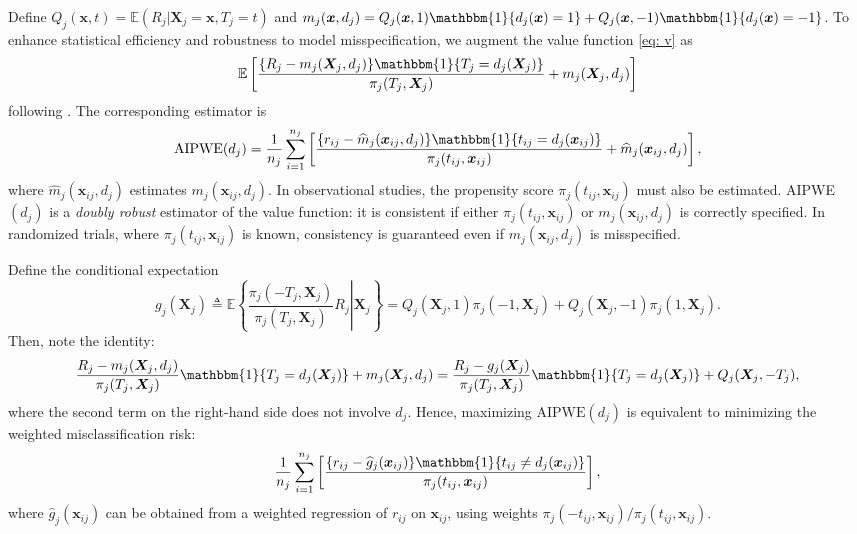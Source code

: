 \documentclass[12pt]{article}
\begin{document}
Define $Q_j(\boldsymbol x,t)=\mathbb{E}(R_j|\boldsymbol X_j=\boldsymbol x, T_{j}=t)$ and $m_j(\boldsymbol x,d_j)=Q_j(\boldsymbol x,1)\mathbbm{1}\{d_j(\boldsymbol x)=1\}+Q_j(\boldsymbol x,-1)\mathbbm{1}\{d_j(\boldsymbol x)=-1\}$. To enhance statistical efficiency and robustness to model misspecification, we augment the value function \eqref{eq: v} as 
\begin{equation*}
\mathbb{E}\left[\frac{\{R_j-m_j(\boldsymbol X_j, d_j)\}\mathbbm{1}\{T_j=d_j(\boldsymbol X_j)\}}{\pi_j(T_j,\boldsymbol X_j)}+m_j(\boldsymbol X_j, d_j)\right]
\end{equation*}
following \cite{zhang2012robust}. The corresponding estimator is
\begin{equation*}
\text{AIPWE}(d_j)=\frac{1}{n_j}\sum^{n_j}_{i=1}\left[\frac{\left\{r_{ij}-\widehat{m}_j(\boldsymbol x_{ij}, d_j)\}\mathbbm{1}\{t_{ij}=d_j(\boldsymbol x_{ij})\right\}}{\pi_j(t_{ij}, \boldsymbol x_{ij})}+\widehat{m}_j(\boldsymbol x_{ij}, d_j)\right],
\end{equation*}
where $\widehat{m}_j(\boldsymbol x_{ij}, d_j)$ estimates $m_j(\boldsymbol x_{ij}, d_j)$. In observational studies, the propensity score $\pi_j(t_{ij}, \boldsymbol x_{ij})$ must also be estimated. AIPWE$(d_j)$ is a {\it doubly robust} estimator of the value function: it is consistent if either $\pi_j(t_{ij}, \boldsymbol x_{ij})$ or $m_j(\boldsymbol x_{ij}, d_j)$ is correctly specified. In randomized trials, where $\pi_j(t_{ij}, \boldsymbol x_{ij})$ is known, consistency is guaranteed even if $m_j(\boldsymbol x_{ij}, d_j)$ is misspecified.

Define the conditional expectation
\begin{equation*}
g_j(\boldsymbol X_j)\triangleq\mathbb{E}\left\{\left.\frac{\pi_j(-T_j,\boldsymbol X_j)}{\pi_j(T_j,\boldsymbol X_j)}R_j\right|\boldsymbol X_j\right\}=Q_j(\boldsymbol X_j,1)\pi_j(-1,\boldsymbol X_j)+Q_j(\boldsymbol X_j,-1)\pi_j(1,\boldsymbol X_j).
\end{equation*}
Then, note the identity: 
\begin{equation*}
\frac{R_j-m_j(\boldsymbol X_j, d_j)}{\pi_j(T_j,\boldsymbol X_j)}\mathbbm{1}\{T_j=d_j(\boldsymbol X_j)\}+m_j(\boldsymbol X_j, d_j)=\frac{R_j-g_j(\boldsymbol X_j)}{\pi_j(T_j,\boldsymbol X_j)}\mathbbm{1}\{T_j=d_j(\boldsymbol X_j)\}+Q_j(\boldsymbol X_j,-T_j),
\end{equation*}
where the second term on the right-hand side does not involve $d_j$. Hence, maximizing $\text{AIPWE}(d_j)$ is equivalent to minimizing the weighted misclassification risk:
\begin{equation*}
\frac{1}{n_j}\sum^{n_j}_{i=1}\left[\frac{\{r_{ij}-\widehat{g}_j(\boldsymbol x_{ij})\}\mathbbm{1}\{t_{ij}\neq d_j(\boldsymbol x_{ij})\}}{ \pi_j(t_{ij},\boldsymbol x_{ij})}\right],
\end{equation*}
where $\widehat{g}_j(\boldsymbol x_{ij})$ can be obtained from a weighted regression of $r_{ij}$ on $\boldsymbol x_{ij}$, using weights $\pi_j(-t_{ij},\boldsymbol x_{ij})/\pi_j(t_{ij},\boldsymbol x_{ij})$.
\end{document}
